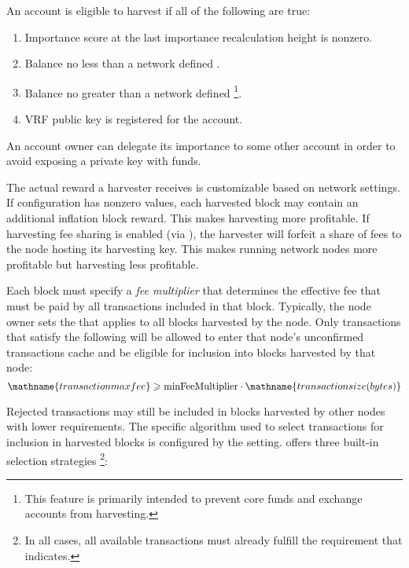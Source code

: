 An account is eligible to harvest if all of the following are true:
\begin{enumerate}
	\item{Importance score at the last importance recalculation height is nonzero.}
	\item{Balance no less than a network defined .}
	\item{
		Balance no greater than a network defined 
		\footnote{This feature is primarily intended to prevent core funds and exchange accounts from harvesting.}.
	}
	\item{VRF public key is registered for the account.}
\end{enumerate}

An account owner can delegate its importance to some other account in order to avoid exposing a private key with funds.

The actual reward a harvester receives is customizable based on network settings.
If  configuration has nonzero values, each harvested block may contain an additional inflation block reward.
This makes harvesting more profitable.
If harvesting fee sharing is enabled (via ), the harvester will forfeit a share of fees to the node hosting its harvesting key.
This makes running network nodes more profitable but harvesting less profitable.


Each block must specify a \emph{fee multiplier} that determines the effective fee that must be paid by all transactions included in that block.
Typically, the node owner sets the  that applies to all blocks harvested by the node.
Only transactions that satisfy the following will be allowed to enter that node's unconfirmed transactions cache and be eligible for inclusion into blocks harvested by that node:
\begin{equation}
	\mathname{transaction max fee} \geqslant \nemsetting{node}{minFeeMultiplier} \cdot \mathname{transaction size (bytes)}
\end{equation}

Rejected transactions may still be included in blocks harvested by other nodes with lower requirements.
The specific algorithm used to select transactions for inclusion in harvested blocks is configured by the  setting.
\codenamespace offers three built-in selection strategies
\footnote{In all cases, all available transactions must already fulfill the requirement that  indicates.}:

